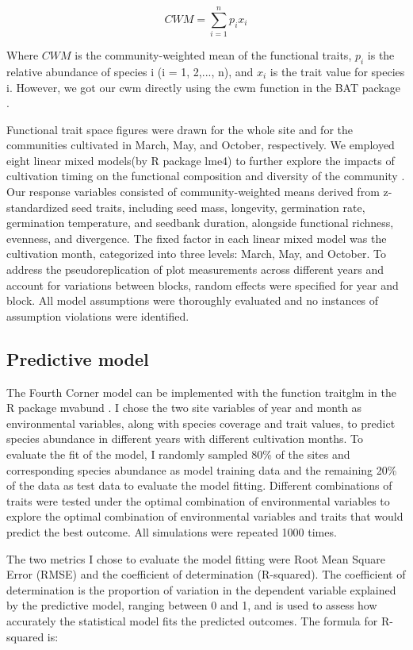 \documentclass[a4paper, 11, margin=2cm]{article}
\begin{document}
      \begin{equation} CWM = \sum_{i=1}^n p_i x_i \end{equation}

    Where $CWM$ is the community-weighted mean of the functional traits, $p_i$ is the relative abundance of species i (i = 1, 2,..., n), and $x_i$ is the trait value for species i. However, we got our cwm directly using the cwm function in the BAT package \citep{BAT}.

    Functional trait space figures were drawn for the whole site and for the communities cultivated in March, May, and October, respectively. We employed eight linear mixed models(by R package lme4) to further explore the impacts of cultivation timing on the functional composition and diversity of the community \citep{lme4}. Our response variables consisted of community-weighted means derived from z-standardized seed traits, including seed mass, longevity, germination rate, germination temperature, and seedbank duration, alongside functional richness, evenness, and divergence. The fixed factor in each linear mixed model was the cultivation month, categorized into three levels: March, May, and October. To address the pseudoreplication of plot measurements across different years and account for variations between blocks, random effects were specified for year and block. All model assumptions were thoroughly evaluated and no instances of assumption violations were identified.

    \subsection{Predictive model}

    The Fourth Corner model can be implemented with the function traitglm in the R package mvabund \citep{mvabund}. I chose the two site variables of year and month as environmental variables, along with species coverage and trait values, to predict species abundance in different years with different cultivation months. To evaluate the fit of the model, I randomly sampled 80\% of the sites and corresponding species abundance as model training data and the remaining 20\% of the data as test data to evaluate the model fitting. Different combinations of traits were tested under the optimal combination of environmental variables to explore the optimal combination of environmental variables and traits that would predict the best outcome. All simulations were repeated 1000 times.

    The two metrics I chose to evaluate the model fitting were Root Mean Square Error (RMSE) and the coefficient of determination (R-squared). The coefficient of determination is the proportion of variation in the dependent variable explained by the predictive model, ranging between 0 and 1, and is used to assess how accurately the statistical model fits the predicted outcomes. The formula for R-squared is:
\end{document}
